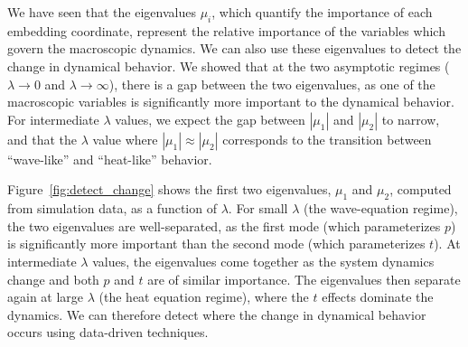 \documentclass[prl, reprint, final, showkeys]{revtex4-1}
\begin{document}
We have seen that the eigenvalues $\mu_i$, which quantify the importance of each embedding coordinate, represent the relative importance of the variables which govern the macroscopic dynamics.
%
We can also use these eigenvalues to detect the change in dynamical behavior.
%
We showed that at the two asymptotic regimes ($\lambda \rightarrow 0$ and $\lambda \rightarrow \infty$), there is a gap between the two eigenvalues, as one of the macroscopic variables is significantly more important to the dynamical behavior.
%
For intermediate $\lambda$ values, we expect the gap between $|\mu_1|$ and $|\mu_2|$ to narrow, and that the $\lambda$ value where $|\mu_1| \approx |\mu_2|$ corresponds to the transition between ``wave-like'' and ``heat-like'' behavior. 

Figure~\ref{fig:detect_change} shows the first two eigenvalues, $\mu_1$ and $\mu_2$, computed from simulation data, as a function of $\lambda$.
% 
%
For small $\lambda$ (the wave-equation regime), the two eigenvalues are well-separated, as the first mode (which parameterizes $p$) is significantly more important than the second mode (which parameterizes $t$).
%
At intermediate $\lambda$ values, the eigenvalues come together as the system dynamics change and both $p$ and $t$ are of similar importance.
%
The eigenvalues then separate again at large $\lambda$ (the heat equation regime), where the $t$ effects dominate the dynamics.
%
We can therefore detect where the change in dynamical behavior occurs using data-driven techniques.

\end{document}
